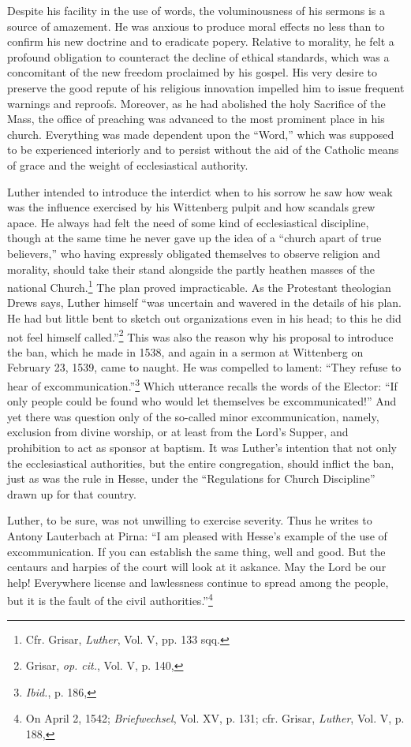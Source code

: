 Despite his facility in the use of words, the voluminousness of his
sermons is a source of amazement. He was anxious to produce moral
effects no less than to confirm his new doctrine and to eradicate popery.
Relative to morality, he felt a profound obligation to counteract the
decline of ethical standards, which was a concomitant of the
new freedom proclaimed by his gospel. His very desire to preserve the
good repute of his religious innovation impelled him to issue frequent
warnings and reproofs. Moreover, as he had abolished the holy Sacrifice
of the Mass, the office of preaching was advanced to the most
prominent place in his church. Everything was made dependent
upon the “Word,” which was supposed to be experienced interiorly
and to persist without the aid of the Catholic means of grace and the
weight of ecclesiastical authority.

Luther intended to introduce the interdict when to his sorrow he
saw how weak was the influence exercised by his Wittenberg pulpit
and how scandals grew apace. He always had felt the need of some
kind of ecclesiastical discipline, though at the same time he never
gave up the idea of a “church apart of true believers,” who having
expressly obligated themselves to observe religion and morality,
should take their stand alongside the partly heathen masses of the
national Church.\footnote{Cfr. Grisar, \textit{Luther}, Vol. V, pp. 133 sqq.}
The plan proved impracticable. As the Protestant
theologian Drews says, Luther himself “was uncertain and
wavered in the details of his plan. He had but little bent to sketch out
organizations even in his head; to this he did not feel himself
called.”\footnote{Grisar, \textit{op. cit.}, Vol. V, p. 140,}
This was also the reason why his proposal to introduce the
ban, which he made in 1538, and again in a sermon at Wittenberg
on February 23, 1539, came to naught. He was compelled to lament:
“They refuse to hear of excommunication.”\footnote{\textit{Ibid.}, p. 186,}
Which utterance recalls
the words of the Elector: “If only people could be found who would
let themselves be excommunicated!” And yet there was question only
of the so-called minor excommunication, namely, exclusion from
divine worship, or at least from the Lord’s Supper, and prohibition to
act as sponsor at baptism. It was Luther’s intention that not only the
ecclesiastical authorities, but the entire congregation, should inflict the
ban, just as was the rule in Hesse, under the “Regulations for Church
Discipline” drawn up for that country.

Luther, to be sure, was not unwilling to exercise severity. Thus he
writes to Antony Lauterbach at Pirna: “I am pleased with Hesse’s
example of the use of excommunication. If you can establish the same
thing, well and good. But the centaurs and harpies of the court will
look at it askance. May the Lord be our help! Everywhere license and
lawlessness continue to spread among the people, but it is the fault of
the civil authorities.”\footnote{On April 2, 1542; \textit{Briefwechsel}, Vol. XV, p. 131; cfr. Grisar, \textit{Luther}, Vol. V, p. 188,}


